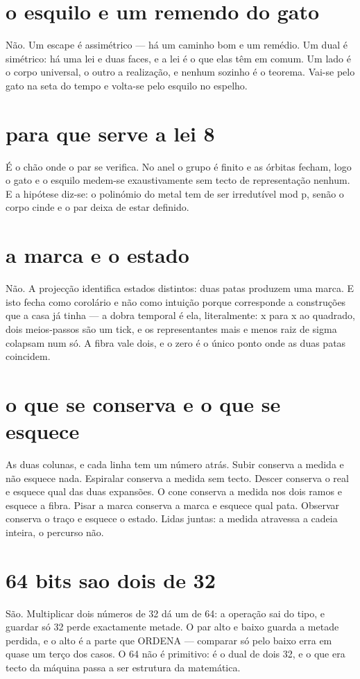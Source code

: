 \documentclass[11pt,a4paper]{article}
\begin{document}
\section{o esquilo e um remendo do gato}
Não. Um escape é assimétrico — há um caminho bom e um remédio. Um dual é simétrico: há
uma lei e duas faces, e a lei é o que elas têm em comum. Um lado é o corpo universal, o
outro a realização, e nenhum sozinho é o teorema. Vai-se pelo gato na seta do tempo e
volta-se pelo esquilo no espelho.

\section{para que serve a lei 8}
É o chão onde o par se verifica. No anel o grupo é finito e as órbitas fecham, logo o
gato e o esquilo medem-se exaustivamente sem tecto de representação nenhum. E a hipótese
diz-se: o polinómio do metal tem de ser irredutível mod p, senão o corpo cinde e o par
deixa de estar definido.

\section{a marca e o estado}
Não. A projecção identifica estados distintos: duas patas produzem uma marca. E isto
fecha como corolário e não como intuição porque corresponde a construções que a casa já
tinha — a dobra temporal é ela, literalmente: x para x ao quadrado, dois meios-passos são
um tick, e os representantes mais e menos raiz de sigma colapsam num só. A fibra vale
dois, e o zero é o único ponto onde as duas patas coincidem.

\section{o que se conserva e o que se esquece}
As duas colunas, e cada linha tem um número atrás. Subir conserva a medida e não esquece
nada. Espiralar conserva a medida sem tecto. Descer conserva o real e esquece qual das
duas expansões. O cone conserva a medida nos dois ramos e esquece a fibra. Pisar a marca
conserva a marca e esquece qual pata. Observar conserva o traço e esquece o estado. Lidas
juntas: a medida atravessa a cadeia inteira, o percurso não.

\section{64 bits sao dois de 32}
São. Multiplicar dois números de 32 dá um de 64: a operação sai do tipo, e guardar só 32
perde exactamente metade. O par alto e baixo guarda a metade perdida, e o alto é a parte
que ORDENA — comparar só pelo baixo erra em quase um terço dos casos. O 64 não é
primitivo: é o dual de dois 32, e o que era tecto da máquina passa a ser estrutura da
matemática.
\end{document}

